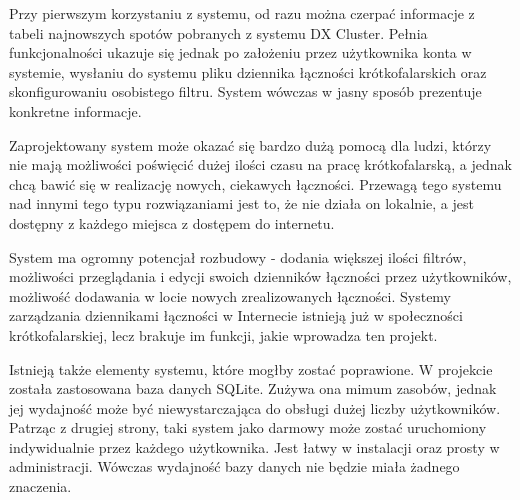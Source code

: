 \documentclass[]{mgr}
\begin{document}
    Przy pierwszym korzystaniu z systemu, od razu można czerpać informacje z tabeli najnowszych spotów pobranych z systemu DX Cluster. Pełnia funkcjonalności ukazuje się jednak po założeniu przez użytkownika konta w systemie, wysłaniu do systemu pliku dziennika łączności krótkofalarskich oraz skonfigurowaniu osobistego filtru. System wówczas w jasny sposób prezentuje konkretne informacje.

    Zaprojektowany system może okazać się bardzo dużą pomocą dla ludzi, którzy nie mają możliwości poświęcić dużej ilości czasu na pracę krótkofalarską, a jednak chcą bawić się w realizację nowych, ciekawych łączności. Przewagą tego systemu nad innymi tego typu rozwiązaniami jest to, że nie działa on lokalnie, a jest dostępny z każdego miejsca z dostępem do internetu. 

    System ma ogromny potencjał rozbudowy - dodania większej ilości filtrów, możliwości przeglądania i edycji swoich dzienników łączności przez użytkowników, możliwość dodawania w locie nowych zrealizowanych łączności. Systemy zarządzania dziennikami łączności w Internecie istnieją już w społeczności krótkofalarskiej, lecz brakuje im funkcji, jakie wprowadza ten projekt.

    Istnieją także elementy systemu, które mogłby zostać poprawione. W projekcie została zastosowana baza danych SQLite. Zużywa ona mimum zasobów, jednak jej wydajność może być niewystarczająca do obsługi dużej liczby użytkowników. Patrząc z drugiej strony, taki system jako darmowy może zostać uruchomiony indywidualnie przez każdego użytkownika. Jest łatwy w instalacji oraz prosty w administracji. Wówczas wydajność bazy danych nie będzie miała żadnego znaczenia.

    \nocite{*}
    

    \listoffigures
\end{document}
